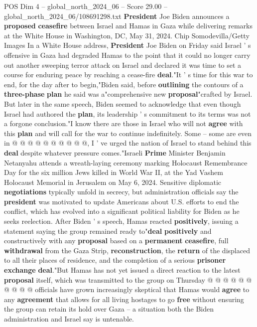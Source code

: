 \begin{textsample}{POS Dim 4 – global\_north\_2024\_06 – Score 29.00 – global\_north\_2024\_06/108691298.txt}  \label{ex:f4_pos_132}
\textbf{President} Joe Biden announces a \textbf{proposed} \textbf{ceasefire} between Israel and Hamas in Gaza while delivering remarks at the White House in Washington, DC, May 31, 2024.
Chip Somodevilla/Getty Images In a White House address, \textbf{President} Joe Biden on Friday said Israel ' s offensive in Gaza had degraded Hamas to the point that it could no longer carry out another sweeping terror attack on Israel and declared it was time to set a course for enduring peace by reaching a cease-fire \textbf{deal}."It ' s time for this war to end, for the day after to begin,"Biden said, before \textbf{outlining} the contours of a \textbf{three-phase} \textbf{plan} he said was a"comprehensive new \textbf{proposal}"crafted by Israel.
But later in the same speech, Biden seemed to acknowledge that even though Israel had authored the \textbf{plan}, its leadership ' s commitment to its terms was not a forgone conclusion."I know there are those in Israel who will not \textbf{agree} with this \textbf{plan} and will call for the war to continue indefinitely.
Some -- some are even in @ @ @ @ @ @ @ @ @ @, I ' ve urged the nation of Israel to stand behind this \textbf{deal} despite whatever pressure comes."Israeli \textbf{Prime} Minister Benjamin Netanyahu attends a wreath-laying ceremony marking Holocaust Remembrance Day for the six million Jews killed in World War II, at the Yad Vashem Holocaust Memorial in Jerusalem on May 6, 2024.
Sensitive diplomatic \textbf{negotiations} typically unfold in secrecy, but administration officials say the \textbf{president} was motivated to update Americans about U.S. efforts to end the conflict, which has evolved into a significant political liability for Biden as he seeks reelection.
After Biden ' s speech, Hamas reacted \textbf{positively}, issuing a statement saying the group remained ready to"\textbf{deal} \textbf{positively} and constructively with any \textbf{proposal} based on a \textbf{permanent} \textbf{ceasefire}, full \textbf{withdrawal} from the Gaza Strip, \textbf{reconstruction}, the \textbf{return} of the displaced to all their places of residence, and the completion of a serious \textbf{prisoner} \textbf{exchange} \textbf{deal}."But Hamas has not yet issued a direct reaction to the latest \textbf{proposal} itself, which was transmitted to the group on Thursday @ @ @ @ @ @ @ @ @ @ officials have grown increasingly skeptical that Hamas would \textbf{agree} to any \textbf{agreement} that allows for all living hostages to go \textbf{free} without ensuring the group can retain its hold over Gaza -- a situation both the Biden administration and Israel say is untenable.

\end{textsample}
